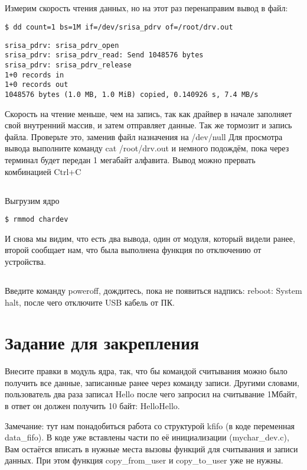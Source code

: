 \subsection{}Измерим скорость чтения данных, но на этот раз перенаправим вывод в файл: 
\begin{lstlisting}[style=bash]
$ dd count=1 bs=1M if=/dev/srisa_pdrv of=/root/drv.out
\end{lstlisting}
\begin{lstlisting}[style=stdout]
srisa_pdrv: srisa_pdrv_open 
srisa_pdrv: srisa_pdrv_read: Send 1048576 bytes 
srisa_pdrv: srisa_pdrv_release 
1+0 records in 
1+0 records out 
1048576 bytes (1.0 MB, 1.0 MiB) copied, 0.140926 s, 7.4 MB/s
\end{lstlisting}
Скорость на чтение меньше, чем на запись, так как драйвер в начале заполняет свой внутренний массив, и затем отправляет данные. Так же тормозит и запись файла. Проверьте это, заменив файл назначения на /dev/null Для просмотра вывода выполните команду cat /root/drv.out и немного подождём, пока через терминал будет передан 1 мегабайт алфавита. Вывод можно прервать комбинацией Ctrl+C

\subsection{}Выгрузим ядро 
\begin{lstlisting}[style=bash]
$ rmmod chardev
\end{lstlisting}
И снова мы видим, что есть два вывода, один от модуля, который видели ранее, второй сообщает нам, что была выполнена функция по отключению от устройства.  

\subsection{}Введите команду poweroff, дождитесь, пока не появиться надпись: reboot: System halt, после чего отключите USB кабель от ПК. 

\section{Задание для закрепления}
Внесите правки в модуль ядра, так, что бы командой считывания можно было получить все данные, записанные ранее через команду записи. Другими словами, пользователь два раза записал Hello после чего запросил на считывание 1Мбайт, в ответ он должен получить 10 байт: HelloHello.

Замечание: тут нам понадобиться работа со структурой kfifo (в коде переменная data\_fifo). В коде уже вставлены части по её инициализации (mychar\_dev.c), Вам остаётся вписать в нужные места вызовы функций для считывания и записи данных. При этом функция copy\_from\_user и copy\_to\_user уже не нужны.

